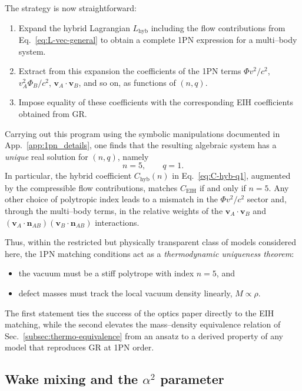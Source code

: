 \documentclass[11pt]{article}
\begin{document}
The strategy is now straightforward:

\begin{enumerate}
\item Expand the hybrid Lagrangian \(L_{\text{hyb}}\) including the flow
      contributions from Eq.~\eqref{eq:L-vec-general} to obtain a complete
      1PN expression for a multi--body system.
\item Extract from this expansion the coefficients of the 1PN terms
      \(\Phi v^2/c^2\), \(v_A^2 \Phi_B/c^2\),
      \(\mathbf{v}_A\cdot\mathbf{v}_B\), and so on, as functions of
      \((n,q)\).
\item Impose equality of these coefficients with the corresponding
      EIH coefficients obtained from GR.
\end{enumerate}

Carrying out this program using the symbolic manipulations documented in
App.~\ref{app:1pn_details}, one finds that the resulting algebraic system
has a \emph{unique} real solution for \((n,q)\), namely
\begin{equation}
  n = 5,
  \qquad
  q = 1.
  \label{eq:n5-q1-solution}
\end{equation}
In particular, the hybrid coefficient \(C_{\text{hyb}}(n)\) in
Eq.~\eqref{eq:C-hyb-q1}, augmented by the compressible flow contributions,
matches \(C_{\text{EIH}}\) if and only if \(n=5\).  Any other choice of
polytropic index leads to a mismatch in the \(\Phi v^2/c^2\) sector and,
through the multi--body terms, in the relative weights of the
\(\mathbf{v}_A\cdot\mathbf{v}_B\) and
\((\mathbf{v}_A\cdot\mathbf{n}_{AB})(\mathbf{v}_B\cdot\mathbf{n}_{AB})\)
interactions.

Thus, within the restricted but physically transparent class of models
considered here, the 1PN matching conditions act as a \emph{thermodynamic
uniqueness theorem}:
\begin{itemize}
  \item the vacuum must be a stiff polytrope with index \(n=5\), and
  \item defect masses must track the local vacuum density linearly,
        \(M \propto \rho\).
\end{itemize}
The first statement ties the success of the optics paper directly to the
EIH matching, while the second elevates the mass--density equivalence
relation of Sec.~\ref{subsec:thermo-equivalence} from an ansatz to a derived
property of any model that reproduces GR at 1PN order.

\subsection{Wake mixing and the \texorpdfstring{$\alpha^2$}{alpha squared} parameter}
\label{subsec:hybrid-alpha}
\end{document}
